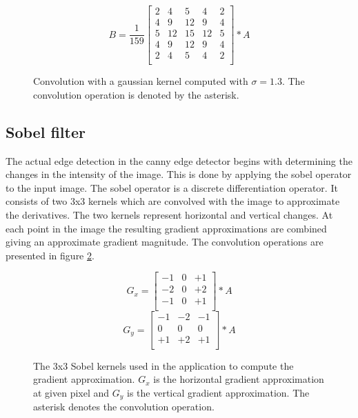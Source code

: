 \begin{figure}
    \begin{displaymath}
        B = \frac{1}{159}\begin{bmatrix}
             2 & 4 & 5 & 4 & 2 \\
             4 & 9 & 12 & 9 & 4 \\
             5 & 12 & 15 & 12 & 5 \\
             4 & 9 & 12 & 9 & 4 \\
             2 & 4 & 5 & 4 & 2 \\
        \end{bmatrix} \ast A
    \end{displaymath}
    \caption{Convolution with a gaussian kernel computed with $\sigma = 1.3$. The convolution operation is denoted by the asterisk.}
    \label{fig:gaussmat}
\end{figure}

\subsection{Sobel filter}
\label{subsec:sobel}
The actual edge detection in the canny edge detector begins with determining the changes in the intensity of the image. This is done by applying the sobel operator to the input image. The sobel operator is a discrete differentiation operator. It consists of two 3x3 kernels which are convolved with the image to approximate the derivatives. The two kernels represent horizontal and vertical changes. At each point in the image the resulting gradient approximations are combined giving an approximate gradient magnitude. \cite{gonzalez2008digital} The convolution operations are presented in figure \ref{fig:sobelmat}.

\begin{figure}
    \begin{displaymath}
        G_{x} = \begin{bmatrix}
            -1 & 0 & +1 \\
            -2 & 0 & +2 \\
            -1 & 0 & +1 \\
        \end{bmatrix} \ast A
    \end{displaymath}
    \begin{displaymath}
        G_{y} = \begin{bmatrix}
            -1 & -2 & -1 \\
            0 & 0 & 0 \\
            +1 & +2 & +1 \\
        \end{bmatrix} \ast A
    \end{displaymath}
    \caption{The 3x3 Sobel kernels used in the application to compute the gradient approximation. $G_{x}$ is the horizontal gradient approximation at given pixel and $G_{y}$ is the vertical gradient approximation. The asterisk denotes the convolution operation.}
    \label{fig:sobelmat}
\end{figure}

